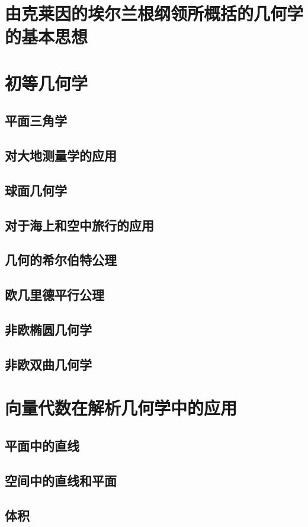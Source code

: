 \chapter{由克莱因的埃尔兰根纲领所概括的几何学的基本思想}

\chapter{初等几何学}
\section{平面三角学}
\section{对大地测量学的应用}
\section{球面几何学}
\section{对于海上和空中旅行的应用}
\section{几何的希尔伯特公理}
\section{欧几里德平行公理}
\section{非欧椭圆几何学}
\section{非欧双曲几何学}

\chapter{向量代数在解析几何学中的应用}
\section{平面中的直线}
\section{空间中的直线和平面}
\section{体积}

